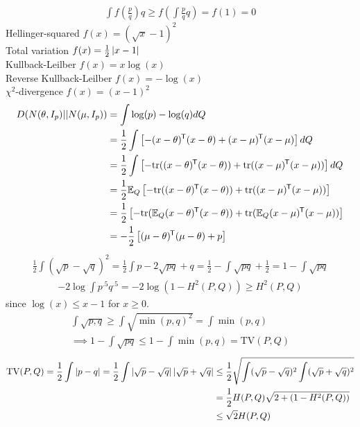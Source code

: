 \documentclass[hidequestions]{homework}
\begin{document}
%
\problem
\subproblem 
\begin{align*}
    \int f(\frac{p}{q})q \geq f(\int \frac{p}{q}q) = f(1) = 0
\end{align*}
\subproblem
Hellinger-squared $f(x) = (\sqrt{x} - 1)^2$ \\
Total variation $f(x) = \frac{1}{2}\left\vert{x-1}\right\vert$\\
Kullback-Leilber $f(x) = x\log(x)$\\
Reverse Kullback-Leilber $f(x) = -\log(x)$\\
$\chi^2$-divergence $f(x) = (x-1)^2$\\
\subproblem 
\begin{align*}
    D(N(\theta,I_p) \vert\vert N(\mu, I_p)) &=\int \log(p) - \log(q) dQ\\
    &= \frac{1}{2}\int \left[-(x-\theta)^{\mkern-1.5mu\mathsf{T}}(x-\theta) + (x-\mu)^{\mkern-1.5mu\mathsf{T}}(x-\mu)\right] dQ\\
    &= \frac{1}{2}\int \left[-\mathrm{tr}((x-\theta)^{\mkern-1.5mu\mathsf{T}}(x-\theta)) + \mathrm{tr}((x-\mu)^{\mkern-1.5mu\mathsf{T}}(x-\mu))\right] dQ\\
    &= \frac{1}{2} \mathbb{E}_{Q} \left[-\mathrm{tr}((x-\theta)^{\mkern-1.5mu\mathsf{T}}(x-\theta)) + \mathrm{tr}((x-\mu)^{\mkern-1.5mu\mathsf{T}}(x-\mu))\right]\\
    &= \frac{1}{2}  \left[-\mathrm{tr}(\mathbb{E}_{Q}(x-\theta)^{\mkern-1.5mu\mathsf{T}}(x-\theta)) + \mathrm{tr}(\mathbb{E}_{Q}(x-\mu)^{\mkern-1.5mu\mathsf{T}}(x-\mu))\right]\\
    &= -\frac{1}{2}  \left[(\mu-\theta)^{\mkern-1.5mu\mathsf{T}}(\mu-\theta) + p \right]\\
\end{align*}
\problem 
\subproblem 
\begin{align*}
    \frac{1}{2}\int(\sqrt{p}-\sqrt{q})^2 = \frac{1}{2}\int p - 2\sqrt{pq} + q = \frac{1}{2} - \int \sqrt{pq} + \frac{1}{2} = 1 - \int \sqrt{pq}
\end{align*}
\subproblem 
\begin{align*}
    -2\log \int p^{.5}q^{.5} = -2 \log (1-H^2(P,Q)) \geq H^2(P,Q)
\end{align*}
since $\log(x) \leq x-1$ for $x \geq 0$.
\subproblem
\begin{align*}
    \int \sqrt{p,q} \geq \int \sqrt{\min(p,q)^2} = \int \min(p,q)\\
    \implies 1 - \int \sqrt{pq} \leq 1 - \int \min(p,q) = \text{TV}(P,Q)
\end{align*}
\subproblem
\begin{align*}
    \text{TV}(P,Q) = \frac{1}{2} \int \left\vert{p-q}\right\vert = \frac{1}{2} \int \left\vert{\sqrt{p}-\sqrt{q}}\right\vert\left\vert{\sqrt{p}+\sqrt{q}}\right\vert &\leq \frac{1}{2} \sqrt{\int (\sqrt{p}-\sqrt{q})^2 \int (\sqrt{p}+\sqrt{q})^2}\\
    &=\frac{1}{2}H(P,Q)\sqrt{2 + (1-H^2(P,Q))}\\
    &\leq \sqrt{2} H(P,Q)
\end{align*}
\end{document}
